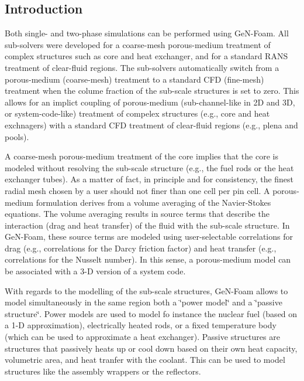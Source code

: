 \subsection*{Introduction}

Both single-\/ and two-\/phase simulations can be performed using Ge\+N-\/\+Foam. All sub-\/solvers were developed for a coarse-\/mesh porous-\/medium treatment of complex structures such as core and heat exchanger, and for a standard R\+A\+NS treatment of clear-\/fluid regions. The sub-\/solvers automatically switch from a porous-\/medium (coarse-\/mesh) treatment to a standard C\+FD (fine-\/mesh) treatment when the colume fraction of the sub-\/scale structures is set to zero. This allows for an implict coupling of porous-\/medium (sub-\/channel-\/like in 2D and 3D, or system-\/code-\/like) treatment of compelex structures (e.\+g., core and heat exchnagers) with a standard C\+FD treatment of clear-\/fluid regions (e.\+g., plena and pools).

A coarse-\/mesh porous-\/medium treatment of the core implies that the core is modeled without resolving the sub-\/scale structure (e.\+g., the fuel rods or the heat exchanger tubes). As a matter of fact, in principle and for consistency, the finest radial mesh chosen by a user should not finer than one cell per pin cell. A porous-\/medium formulation derives from a volume averaging of the Navier-\/\+Stokes equations. The volume averaging results in source terms that describe the interaction (drag and heat transfer) of the fluid with the sub-\/scale structure. In Ge\+N-\/\+Foam, these source terms are modeled using user-\/selectable correlations for drag (e.\+g., correlations for the Darcy friction factor) and heat transfer (e.\+g., correlations for the Nusselt number). In this sense, a porous-\/medium model can be associated with a 3-\/D version of a system code.

With regards to the modelling of the sub-\/scale structures, Ge\+N-\/\+Foam allows to model simultaneously in the same region both a \char`\"{}power model\char`\"{} and a \char`\"{}passive structure\char`\"{}. Power models are used to model fo instance the nuclear fuel (based on a 1-\/D approximation), electrically heated rods, or a fixed temperature body (which can be used to approximate a heat exchanger). Passive structures are structures that passively heats up or cool down based on their own heat capacity, volumetric area, and heat tranfer with the coolant. This can be used to model structures like the assembly wrappers or the reflectors.

